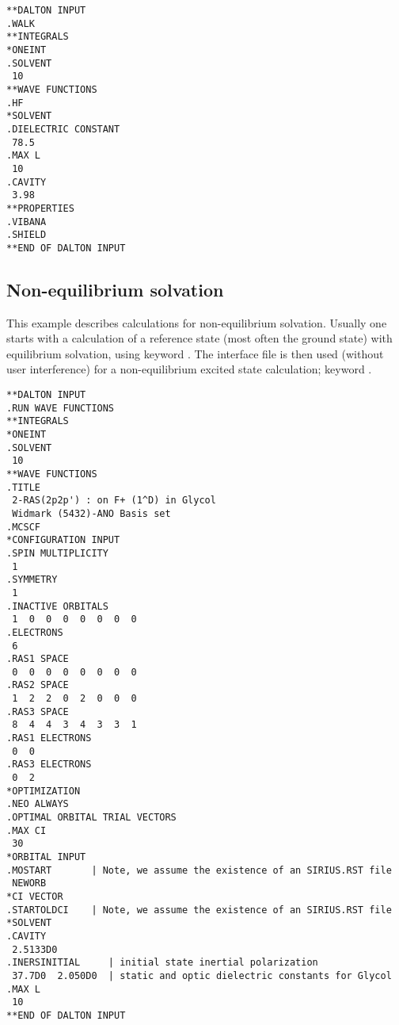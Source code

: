 \begin{verbatim}
**DALTON INPUT
.WALK
**INTEGRALS
*ONEINT
.SOLVENT
 10
**WAVE FUNCTIONS
.HF
*SOLVENT
.DIELECTRIC CONSTANT
 78.5
.MAX L
 10
.CAVITY
 3.98
**PROPERTIES
.VIBANA
.SHIELD
**END OF DALTON INPUT
\end{verbatim}


\subsection{Non-equilibrium solvation}\label{sec:solvnoneqrsp}

This example describes calculations for non-equilibrium
solvation. Usually one starts with a calculation of a reference state
(most often the ground state) with equilibrium solvation, using
keyword . The interface file is then
used (without user interference) for
a non-equilibrium excited state calculation; keyword
.

\begin{verbatim}
**DALTON INPUT
.RUN WAVE FUNCTIONS
**INTEGRALS
*ONEINT
.SOLVENT
 10
**WAVE FUNCTIONS
.TITLE
 2-RAS(2p2p') : on F+ (1^D) in Glycol
 Widmark (5432)-ANO Basis set
.MCSCF
*CONFIGURATION INPUT
.SPIN MULTIPLICITY
 1
.SYMMETRY
 1
.INACTIVE ORBITALS
 1  0  0  0  0  0  0  0
.ELECTRONS
 6
.RAS1 SPACE
 0  0  0  0  0  0  0  0
.RAS2 SPACE
 1  2  2  0  2  0  0  0
.RAS3 SPACE
 8  4  4  3  4  3  3  1
.RAS1 ELECTRONS
 0  0
.RAS3 ELECTRONS
 0  2
*OPTIMIZATION
.NEO ALWAYS
.OPTIMAL ORBITAL TRIAL VECTORS
.MAX CI
 30
*ORBITAL INPUT
.MOSTART       | Note, we assume the existence of an SIRIUS.RST file
 NEWORB
*CI VECTOR
.STARTOLDCI    | Note, we assume the existence of an SIRIUS.RST file
*SOLVENT
.CAVITY
 2.5133D0
.INERSINITIAL     | initial state inertial polarization
 37.7D0  2.050D0  | static and optic dielectric constants for Glycol
.MAX L
 10
**END OF DALTON INPUT
\end{verbatim}
